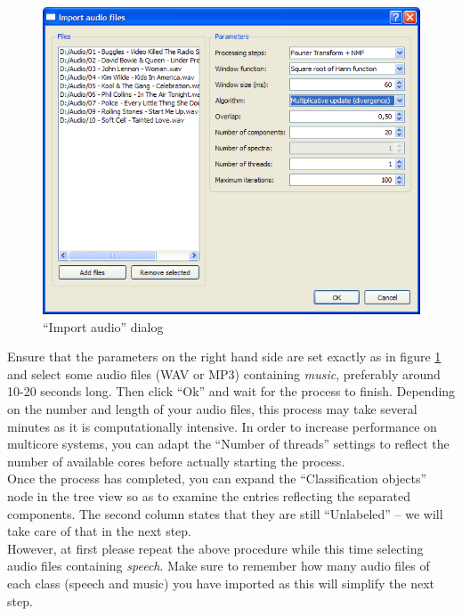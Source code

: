 \begin{figure}
    \centering
    \includegraphics[width=\textwidth]{tutorial-media/ImportAudio.png}
    \caption{%
        \label{figure:TutorialImportAudio}%
        ``Import audio'' dialog
    }
\end{figure}

Ensure that the parameters on the right hand side are set exactly as in figure
\ref{figure:TutorialImportAudio} and select some audio files (WAV or MP3)
containing \emph{music}, preferably around 10-20 seconds long. Then click ``Ok''
and wait for the process to finish. Depending on the number and length of your
audio files, this process may take several minutes as it is computationally
intensive. In order to increase performance on multicore systems, you can adapt
the ``Number of threads'' settings to reflect the number of available cores
before actually starting the process.\\

Once the process has completed, you can expand the ``Classification objects''
node in the tree view so as to examine the entries reflecting the separated
components. The second column states that they are still ``Unlabeled'' --
we will take care of that in the next step.\\

However, at first please repeat the above procedure while this time selecting
audio files containing \emph{speech}. Make sure to remember how many audio files
of each class (speech and music) you have imported as this will simplify the
next step.


